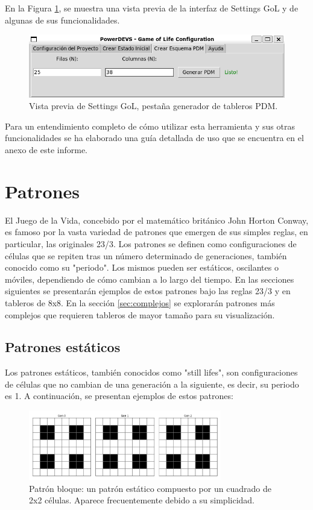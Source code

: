 \documentclass[]{article}
\begin{document}
En la Figura \ref{fig:settingsdevs}, se muestra una vista previa de la interfaz de Settings GoL y de algunas de sus funcionalidades.

\begin{figure}[H]
  \centering
  \includegraphics[width=1\textwidth]{../assets/gui/pestania3.png}
  \caption{Vista previa de Settings GoL, pestaña generador de tableros PDM.}
  \label{fig:settingsdevs}
\end{figure}

Para un entendimiento completo de cómo utilizar esta herramienta y sus otras funcionalidades se ha elaborado una guía detallada de uso que se encuentra en el anexo de este informe.



\section{Patrones}
El Juego de la Vida, concebido por el matemático británico John Horton Conway, es famoso por la vasta variedad de patrones que emergen de sus simples reglas, en particular, las originales 23/3. Los patrones se definen como configuraciones de células que se repiten tras un número determinado de generaciones, también conocido como su "periodo". Los mismos pueden ser estáticos, oscilantes o móviles, dependiendo de cómo cambian a lo largo del tiempo. En las secciones siguientes se presentarán ejemplos de estos patrones bajo las reglas 23/3 y en tableros de 8x8.
En la sección \ref{sec:complejos} se explorarán patrones más complejos que requieren tableros de mayor tamaño para su visualización.

\subsection{Patrones estáticos}
Los patrones estáticos, también conocidos como "still lifes", son configuraciones de células que no cambian de una generación a la siguiente, es decir, su periodo es 1. A continuación, se presentan ejemplos de estos patrones:

\begin{figure}[H]
  \centering
  \includegraphics[width=0.75\textwidth]{../assets/still_life/block/block.png}
  \caption{Patrón bloque: un patrón estático compuesto por un cuadrado de 2x2 células. Aparece frecuentemente debido a su simplicidad.}
  \label{fig:block}
\end{figure}
\end{document}
